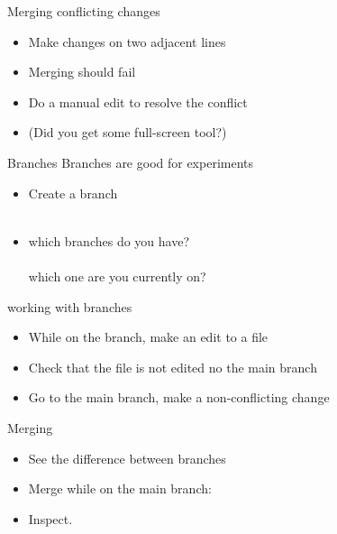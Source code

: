 \documentclass[11pt,headernav]{beamer}
\begin{document}
\begin{numberedframe}{Merging conflicting changes}
  \begin{itemize}
  \item Make changes on two adjacent lines
  \item Merging should fail
  \item Do a manual edit to resolve the conflict
  \item (Did you get some full-screen tool?)
  \end{itemize}
\end{numberedframe}

\begin{numberedframe}{Branches}
  Branches are good for experiments
  \begin{itemize}
  \item Create a branch\\ \\ 
  \item which branches do you have?\\ \\
    which one are you currently on?
  \end{itemize}
\end{numberedframe}

\begin{numberedframe}{working with branches}
  \begin{itemize}
  \item While on the  branch, make an edit to a file
  \item Check that the file is not edited no the main branch
  \item Go to the main branch, make a non-conflicting change 
  \end{itemize}
\end{numberedframe}

\begin{numberedframe}{Merging}
  \begin{itemize}
  \item See the difference between branches\\
  \item Merge while on the main branch:\\
  \item Inspect.
  \end{itemize}
\end{numberedframe}
\end{document}

